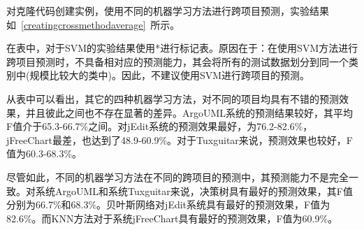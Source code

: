 
对克隆代码创建实例，使用不同的机器学习方法进行跨项目预测，实验结果如~\ref{creatingcrossmethodaverage}~所示。

在表中，对于SVM的实验结果使用{*}进行标记表。原因在于：在使用SVM方法进行跨项目预测时，不具备相对应的预测能力，其会将所有的测试数据划分到同一个类别中(规模比较大的类中)。因此，不建议使用SVM进行跨项目的预测。

从表中可以看出，其它的四种机器学习方法，对不同的项目均具有不错的预测效果，并且彼此之间也不存在显著的差异。ArgoUML系统的预测结果较好，其平均F值介于65.3-66.7\%之间。对jEdit系统的预测效果最好，为76.2-82.6\%，jFreeChart最差，也达到了48.9-60.9\%。对于Tuxguitar来说，预测效果也较好，F值为60.3-68.3\%。

尽管如此，不同的机器学习方法在不同的跨项目的预测中，其预测能力不是完全一致。对系统ArgoUML和系统Tuxguitar来说，决策树具有最好的预测效果，其F值分别为66.7\%和68.3\%。贝叶斯网络对jEdit系统具有最好的预测效果，F值为82.6\%。而KNN方法对于系统jFreeChart具有最好的预测效果，F值为60.9\%。

